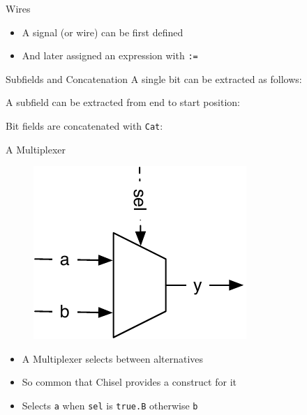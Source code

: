 \documentclass[xcolor=pdflatex,dvipsnames,table]{beamer}
\newcommand{\scale}{0.7}
\newcommand{\code}[1]{{\texttt{#1}}}
\begin{document}
\begin{frame}[fragile]{Wires}
\begin{itemize}
\item A signal (or wire) can be first defined
\item And later assigned an expression with \code{:=}
\end{itemize}
\end{frame}

\begin{frame}[fragile]{Subfields and Concatenation}
A single bit can be extracted as follows:

\noindent A subfield can be extracted from end to start position:

\noindent Bit fields are concatenated with \code{Cat}:
\end{frame}


\begin{frame}[fragile]{A Multiplexer}
\begin{figure}
  \includegraphics[scale=\scale]{../figures/mux}
\end{figure}
\begin{itemize}
\item A Multiplexer selects between alternatives
\item So common that Chisel provides a construct for it
\item Selects \code{a} when \code{sel} is \code{true.B} otherwise \code{b}
\end{itemize}
\end{frame}
\end{document}
